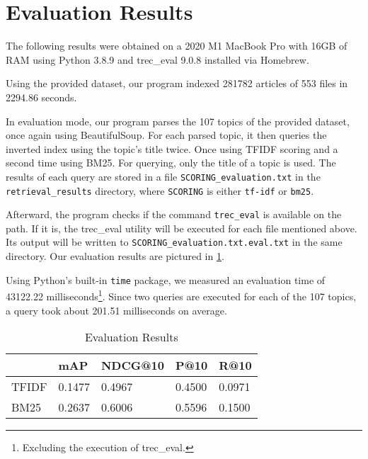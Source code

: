 \section{Evaluation Results}
\label{sec:results}

The following results were obtained on a 2020 M1 MacBook Pro with 16GB of RAM using Python 3.8.9 and trec\_eval 9.0.8 installed via Homebrew.

\medskip

Using the provided dataset, our program indexed 281782 articles of 553 files in 2294.86 seconds.

\medskip

In evaluation mode, our program parses the 107 topics of the provided dataset, once again using BeautifulSoup.
For each parsed topic, it then queries the inverted index using the topic's title twice.
Once using TFIDF scoring and a second time using BM25.
For querying, only the title of a topic is used.
The results of each query are stored in a file \verb|SCORING_evaluation.txt| in the \verb|retrieval_results| directory, where \verb|SCORING| is either \verb|tf-idf| or \verb|bm25|.

Afterward, the program checks if the command \verb|trec_eval| is available on the path.
If it is, the trec\_eval utility will be executed for each file mentioned above.
Its output will be written to \verb|SCORING_evaluation.txt.eval.txt| in the same directory.
Our evaluation results are pictured in \cref{table:results}.

Using Python's built-in \verb|time| package, we measured an evaluation time of 43122.22 milliseconds\footnote{Excluding the execution of trec\_eval.}.
Since two queries are executed for each of the 107 topics, a query took about 201.51 milliseconds on average.

\begin{table}[]
\center
\begin{tabular}{|l|l|l|l|l|}
	\hline
	      & mAP    & NDCG@10 & P@10   & R@10   \\
	\hline
	TFIDF & 0.1477 & 0.4967  & 0.4500 & 0.0971 \\
	\hline
	BM25  & 0.2637 & 0.6006  & 0.5596 & 0.1500 \\
	\hline
\end{tabular}
\caption{Evaluation Results}
\label{table:results}
\end{table}
